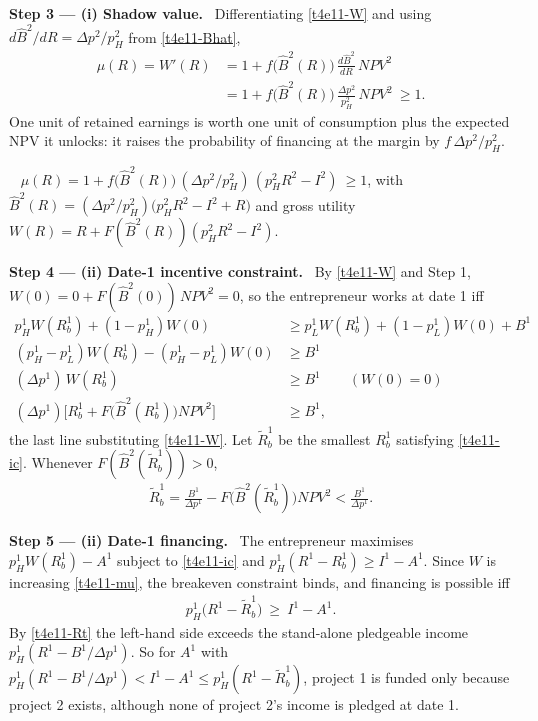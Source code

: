 \documentclass[11pt,a4paper]{article}
\newcommand{\step}[2]{\par\medskip\noindent\textbf{Step #1 --- #2.}~}
\newcommand{\answer}[1]{\par\smallskip\noindent\fbox{\textbf{Answer #1.}}~}
\begin{document}
\step{3}{(i) Shadow value} Differentiating \eqref{t4e11-W} and using
$d\hat B^2/dR=\Delta p^2/p_H^2$ from \eqref{t4e11-Bhat},
\begin{align}
  \mu(R)=W'(R) &= 1+f\big(\hat B^2(R)\big)\,\frac{d\hat B^2}{dR}\,\mathit{NPV}^2 \nonumber\\
               &= 1+f\big(\hat B^2(R)\big)\,\frac{\Delta p^2}{p_H^2}\,\mathit{NPV}^2\ \ge 1. \label{t4e11-mu}
\end{align}
One unit of retained earnings is worth one unit of consumption plus the expected NPV it unlocks: it
raises the probability of financing at the margin by $f\,\Delta p^2/p_H^2$.

\answer{(i)} $\mu(R)=1+f\big(\hat B^2(R)\big)\,(\Delta p^2/p_H^2)\,(p_H^2R^2-I^2)\ \ge1$, with
$\hat B^2(R)=(\Delta p^2/p_H^2)\big(p_H^2R^2-I^2+R\big)$ and gross utility
$W(R)=R+F(\hat B^2(R))(p_H^2R^2-I^2)$.

\step{4}{(ii) Date-1 incentive constraint} By \eqref{t4e11-W} and Step 1, $W(0)=0+F(\hat B^2(0))\,\mathit{NPV}^2=0$, so
the entrepreneur works at date 1 iff
\begin{align}
  p_H^1W(R_b^1)+(1-p_H^1)W(0) &\ge p_L^1W(R_b^1)+(1-p_L^1)W(0)+B^1 \nonumber\\
  (p_H^1-p_L^1)W(R_b^1)-(p_H^1-p_L^1)W(0) &\ge B^1 \nonumber\\
  (\Delta p^1)\,W(R_b^1) &\ge B^1 \qquad (W(0)=0) \nonumber\\
  (\Delta p^1)\big[R_b^1+F\big(\hat B^2(R_b^1)\big)\mathit{NPV}^2\big] &\ge B^1, \tag{IC$^1$}\label{t4e11-ic}
\end{align}
the last line substituting \eqref{t4e11-W}.
Let $\tilde R_b^1$ be the smallest $R_b^1$ satisfying \eqref{t4e11-ic}. Whenever
$F(\hat B^2(\tilde R_b^1))>0$,
\begin{align}
  \tilde R_b^1 = \frac{B^1}{\Delta p^1}-F\big(\hat B^2(\tilde R_b^1)\big)\mathit{NPV}^2 < \frac{B^1}{\Delta p^1}. \label{t4e11-Rt}
\end{align}

\step{5}{(ii) Date-1 financing} The entrepreneur maximises $p_H^1W(R_b^1)-A^1$ subject to
\eqref{t4e11-ic} and $p_H^1(R^1-R_b^1)\ge I^1-A^1$. Since $W$ is increasing \eqref{t4e11-mu}, the
breakeven constraint binds, and financing is possible iff
\begin{align}
  p_H^1\big(R^1-\tilde R_b^1\big)\ \ge\ I^1-A^1. \label{t4e11-fin}
\end{align}
By \eqref{t4e11-Rt} the left-hand side exceeds the stand-alone pledgeable income
$p_H^1(R^1-B^1/\Delta p^1)$. So for $A^1$ with
$p_H^1(R^1-B^1/\Delta p^1)<I^1-A^1\le p_H^1(R^1-\tilde R_b^1)$, project 1 is funded only
because project 2 exists, although none of project 2's income is pledged at date 1.
\end{document}
